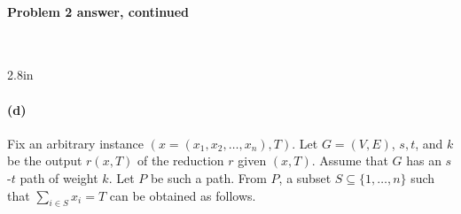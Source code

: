 
\newpage

\paragraph{Problem 2 answer, continued}~

\noindent\begin{answerBox}{2.8in}   %
  
\paragraph{(d)}


Fix an arbitrary  instance $(x=(x_1, x_2, \ldots, x_n), T)$.
Let $G=(V,E)$, $s, t$, and $k$ be the output $r(x, T)$ of the reduction $r$ given $(x, T)$.
Assume that $G$ has an $s$-$t$ path of weight $k$.
Let $P$ be such a path.
From $P$, a subset $S\subseteq \{1,\ldots, n\}$ such that $\sum_{i\in S} x_i = T$ can be obtained as follows.
    
\bigskip 

\begin{blue}
  \REPLACEME
\end{blue}

\bigskip 

\end{answerBox}


